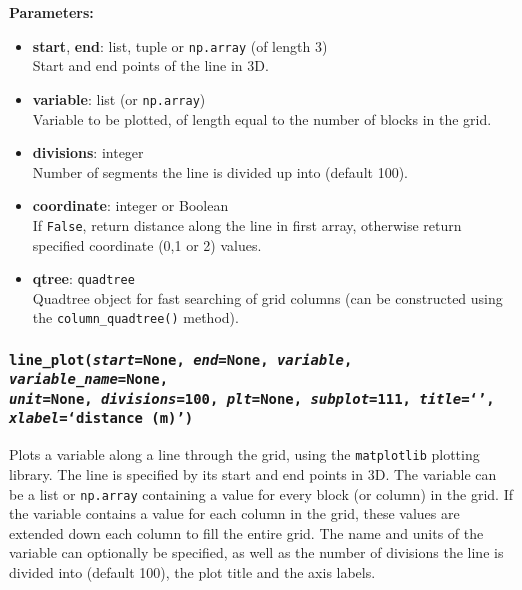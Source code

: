 \textbf{Parameters:}
\begin{itemize}
\item \textbf{start}, \textbf{end}: list, tuple or \texttt{np.array} (of length 3)\\
  Start and end points of the line in 3D.
\item \textbf{variable}: list (or \texttt{np.array})\\
  Variable to be plotted, of length equal to the number of blocks in the grid.
\item \textbf{divisions}: integer\\
  Number of segments the line is divided up into (default 100).
\item \textbf{coordinate}: integer or Boolean\\
  If \texttt{False}, return distance along the line in first array, otherwise return specified coordinate (0,1 or 2) values.
\item \textbf{qtree}: \texttt{quadtree}\\
  Quadtree object for fast searching of grid columns (can be constructed using the \texttt{column\_quadtree()} method).
\end{itemize}

\subsubsection{\texttt{line\_plot(\emph{start}=None, \emph{end}=None, \emph{variable}, \emph{variable\_name}=None,\\
\emph{unit}=None, \emph{divisions}=100, \emph{plt}=None, \emph{subplot}=111, \emph{title}=`',\\
\emph{xlabel}=`distance (m)')}}

Plots a variable along a line through the grid, using the \texttt{matplotlib} plotting library. The line is specified by its start and end points in 3D.  The variable can be a list or \texttt{np.array} containing a value for every block (or column) in the grid.  If the variable contains a value for each column in the grid, these values are extended down each column to fill the entire grid.  The name and units of the variable can optionally be specified, as well as the number of divisions the line is divided into (default 100), the plot title and the axis labels.

